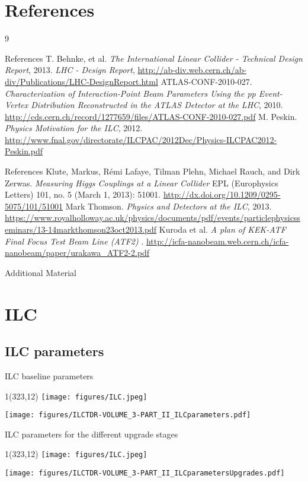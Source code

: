 \documentclass[xcolor={dvipsnames}]{beamer}
\newcommand{\ilclogo}{
  \setlength{\TPHorizModule}{1pt}
  \setlength{\TPVertModule}{1pt}
  \begin{textblock}{1}(323,12)
   \texttt{[image: figures/ILC.jpeg]}
  \end{textblock}
}
\begin{document}
\section*{References}
\begin{thebibliography}{9}
\begin{frame}{References}
 T. Behnke, et al.
\emph{The International Linear Collider - Technical Design Report}, 2013.
 \emph{LHC - Design Report}, \url{http://ab-div.web.cern.ch/ab-div/Publications/LHC-DesignReport.html}
 ATLAS-CONF-2010-027. \emph{Characterization of Interaction-Point Beam Parameters Using the pp Event-Vertex Distribution Reconstructed in the ATLAS Detector at the LHC}, 2010. \url{http://cds.cern.ch/record/1277659/files/ATLAS-CONF-2010-027.pdf}
 M. Peskin. \emph{Physics Motivation for the ILC}, 2012. \url{http://www.fnal.gov/directorate/ILCPAC/2012Dec/Physics-ILCPAC2012-Peskin.pdf}
\end{frame}
\begin{frame}{References}
 Klute, Markus, Rémi Lafaye, Tilman Plehn, Michael Rauch, and
Dirk Zerwas. \emph{Measuring Higgs Couplings at a Linear Collider}
EPL (Europhysics Letters) 101, no. 5 (March 1, 2013): 51001. \url{http://dx.doi.org/10.1209/0295-5075/101/51001}
 Mark Thomson. \emph{Physics and Detectors at the ILC}, 2013. \url{https://www.royalholloway.ac.uk/physics/documents/pdf/events/particlephysicsseminars/13-14markthomson23oct2013.pdf}
 Kuroda et al. \emph{A plan of KEK-ATF Final Focus Test Beam Line (ATF2)
}. \url{http://icfa-nanobeam.web.cern.ch/icfa-nanobeam/paper/urakawa_ATF2-2.pdf}

\end{frame}
\end{thebibliography}

\appendix

\begin{frame}
\begin{center}
\LARGE Additional Material
\end{center}
  \tableofcontents
\end{frame}

\section{ILC}
\subsection{ILC parameters}
\begin{frame}{ILC baseline parameters}
\ilclogo
\centering
	\texttt{[image: figures/ILCTDR-VOLUME\_3-PART\_II\_ILCparameters.pdf]}
\end{frame}
\begin{frame}{ILC parameters for the different upgrade stages}
\ilclogo
\centering
	\texttt{[image: figures/ILCTDR-VOLUME\_3-PART\_II\_ILCparametersUpgrades.pdf]}
\end{frame}
\end{document}
